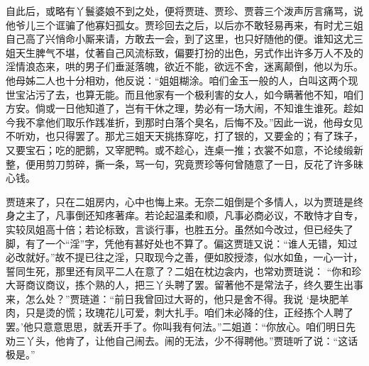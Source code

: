 \begin{parag}
    自此后，或略有丫鬟婆娘不到之处，便将贾琏、贾珍、贾蓉三个泼声厉言痛骂，说他爷儿三个诓骗了他寡妇孤女。贾珍回去之后，以后亦不敢轻易再来，有时尤三姐自己高了兴悄命小厮来请，方敢去一会，到了这里，也只好随他的便。谁知这尤三姐天生脾气不堪，仗著自己风流标致，偏要打扮的出色，另式作出许多万人不及的淫情浪态来，哄的男子们垂涎落魄，欲近不能，欲远不舍，迷离颠倒，他以为乐。他母姊二人也十分相劝，他反说：“姐姐糊涂。咱们金玉一般的人，白叫这两个现世宝沾污了去，也算无能。而且他家有一个极利害的女人，如今瞒著他不知，咱们方安。倘或一日他知道了，岂有干休之理，势必有一场大闹，不知谁生谁死。趁如今我不拿他们取乐作践准折，到那时白落个臭名，后悔不及。”因此一说，他母女见不听劝，也只得罢了。那尤三姐天天挑拣穿吃，打了银的，又要金的；有了珠子，又要宝石；吃的肥鹅，又宰肥鸭。或不趁心，连桌一推；衣裳不如意，不论绫缎新整，便用剪刀剪碎，撕一条，骂一句，究竟贾珍等何曾随意了一日，反花了许多昧心钱。
\end{parag}


\begin{parag}
    贾琏来了，只在二姐房内，心中也悔上来。无奈二姐倒是个多情人，以为贾琏是终身之主了，凡事倒还知疼著痒。若论起温柔和顺，凡事必商必议，不敢恃才自专，实较凤姐高十倍；若论标致，言谈行事，也胜五分。虽然如今改过，但已经失了脚，有了一个“淫”字，凭他有甚好处也不算了。偏这贾琏又说：“谁人无错，知过必改就好。”故不提已往之淫，只取现今之善，便如胶授漆，似水如鱼，一心一计，誓同生死，那里还有凤平二人在意了？二姐在枕边衾内，也常劝贾琏说： “你和珍大哥商议商议，拣个熟的人，把三丫头聘了罢。留著他不是常法子，终久要生出事来，怎么处？”贾琏道：“前日我曾回过大哥的，他只是舍不得。我说 ‘是块肥羊肉，只是烫的慌；玫瑰花儿可爱，刺大扎手。咱们未必降的住，正经拣个人聘了罢。’他只意意思思，就丢开手了。你叫我有何法。”二姐道：“你放心。咱们明日先劝三丫头，他肯了，让他自己闹去。闹的无法，少不得聘他。”贾琏听了说：“这话极是。”
\end{parag}


